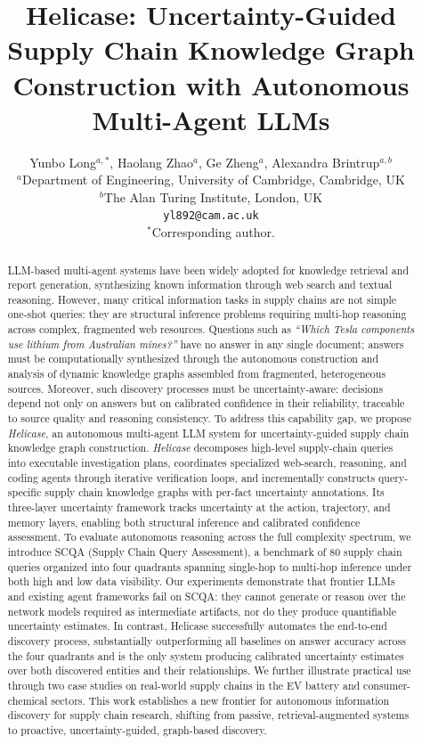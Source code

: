 \documentclass{article}
\title{Helicase: Uncertainty-Guided Supply Chain Knowledge Graph\\
Construction with Autonomous Multi-Agent LLMs}
\author{Yunbo Long$^{a,*}$, Haolang Zhao$^{a}$, Ge Zheng$^{a}$, Alexandra Brintrup$^{a,b}$\\
$^{a}$Department of Engineering, University of Cambridge, Cambridge, UK\\
$^{b}$The Alan Turing Institute, London, UK\\
\texttt{yl892@cam.ac.uk}\\
{\small $^{*}$Corresponding author.}
}
\begin{document}
\maketitle

\begin{abstract}
LLM-based multi-agent systems have been widely adopted for knowledge retrieval and report generation, synthesizing known information through web search and textual reasoning. However, many critical information tasks in supply chains are not simple one-shot queries: they are structural inference problems requiring multi-hop reasoning across complex, fragmented web resources. Questions such as \textit{``Which Tesla components use lithium from Australian mines?''} have no answer in any single document; answers must be computationally synthesized through the autonomous construction and analysis of dynamic knowledge graphs assembled from fragmented, heterogeneous sources. Moreover, such discovery processes must be uncertainty-aware: decisions depend not only on answers but on calibrated confidence in their reliability, traceable to source quality and reasoning consistency.
To address this capability gap, we propose \textit{Helicase}, an autonomous multi-agent LLM system for uncertainty-guided supply chain knowledge graph construction. \textit{Helicase} decomposes high-level supply-chain queries into executable investigation plans, coordinates specialized web-search, reasoning, and coding agents through iterative verification loops, and incrementally constructs query-specific supply chain knowledge graphs with per-fact uncertainty annotations. Its three-layer uncertainty framework tracks uncertainty at the action, trajectory, and memory layers, enabling both structural inference and calibrated confidence assessment.
To evaluate autonomous reasoning across the full complexity spectrum, we introduce SCQA (Supply Chain Query Assessment), a benchmark of 80 supply chain queries organized into four quadrants spanning single-hop to multi-hop inference under both high and low data visibility. Our experiments demonstrate that frontier LLMs and existing agent frameworks fail on SCQA: they cannot generate or reason over the network models required as intermediate artifacts, nor do they produce quantifiable uncertainty estimates. In contrast, Helicase successfully automates the end-to-end discovery process, substantially outperforming all baselines on answer accuracy across the four quadrants and is the only system producing calibrated uncertainty estimates over both discovered entities and their relationships. We further illustrate practical use through two case studies on real-world supply chains in the EV battery and consumer-chemical sectors.
This work establishes a new frontier for autonomous information discovery for supply chain research, shifting from passive, retrieval-augmented systems to proactive, uncertainty-guided, graph-based discovery.
\end{abstract}
\end{document}
